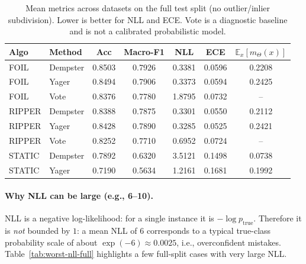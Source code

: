 \documentclass[11pt,a4paper]{article}
\providecommand{\1}{}
\renewcommand{\1}{\mathbbm{1}}
\begin{document}
\begin{table}[t]
\centering
\caption{Mean metrics across datasets on the full test split (no outlier/inlier subdivision). Lower is better for NLL and ECE. Vote is a diagnostic baseline and is not a calibrated probabilistic model.}
\label{tab:mean-metrics-full}
\begin{tabular}{l l S[table-format=1.4] S[table-format=1.4] S[table-format=2.4] S[table-format=1.4] S[table-format=1.4]}
\toprule
Algo & Method & {Acc} & {Macro-F1} & {NLL} & {ECE} & {$\mathbb{E}_x[m_\Theta(x)]$} \\
\midrule
FOIL & Dempster & 0.8503 & 0.7926 & 0.3381 & 0.0596 & 0.2208 \\
FOIL & Yager & 0.8494 & 0.7906 & 0.3373 & 0.0594 & 0.2425 \\
FOIL & Vote & 0.8376 & 0.7780 & 1.8795 & 0.0732 & -- \\
RIPPER & Dempster & 0.8388 & 0.7875 & 0.3301 & 0.0550 & 0.2112 \\
RIPPER & Yager & 0.8428 & 0.7890 & 0.3285 & 0.0525 & 0.2421 \\
RIPPER & Vote & 0.8252 & 0.7710 & 0.6952 & 0.0724 & -- \\
STATIC & Dempster & 0.7892 & 0.6320 & 3.5121 & 0.1498 & 0.0738 \\
STATIC & Yager & 0.7190 & 0.5634 & 1.2161 & 0.1681 & 0.1992 \\
\bottomrule
\end{tabular}
\end{table}

\paragraph{Why NLL can be large (e.g., 6--10).}
NLL is a negative log-likelihood: for a single instance it is $-\log p_{\text{true}}$.
Therefore it is \emph{not} bounded by $1$: a mean NLL of $6$ corresponds to a typical true-class probability scale of about $\exp(-6)\approx 0.0025$, i.e., overconfident mistakes.
Table~\ref{tab:worst-nll-full} highlights a few full-split cases with very large NLL.
\end{document}
